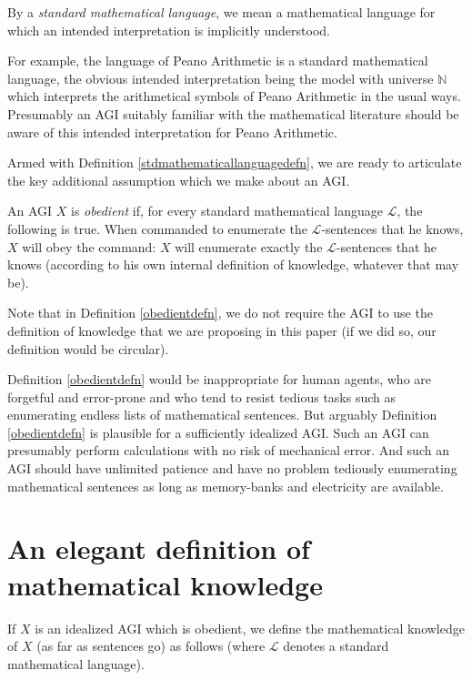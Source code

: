 \documentclass[runningheads]{llncs}
\begin{document}
\begin{definition}
\label{stdmathematicallanguagedefn}
By a \emph{standard mathematical language}, we mean a mathematical language for which an
intended interpretation is implicitly understood.
\end{definition}

For example, the
language of Peano Arithmetic is a standard mathematical language, the obvious
intended interpretation being the model with universe $\mathbb N$ which
interprets the arithmetical symbols of Peano Arithmetic in the usual ways.
Presumably an AGI suitably familiar with the mathematical literature should
be aware of this intended interpretation for Peano Arithmetic.

Armed with Definition \ref{stdmathematicallanguagedefn}, we are ready to articulate
the key additional assumption which we make about an AGI.

\begin{definition}
\label{obedientdefn}
  An AGI $X$ is \emph{obedient} if, for every standard mathematical language
  $\mathscr L$, the following is true. When commanded to enumerate the
  $\mathscr L$-sentences that he knows, $X$ will obey the command:
  $X$ will enumerate exactly the $\mathscr L$-sentences that he knows
  (according to his own internal definition of knowledge,
  whatever that may be).
\end{definition}


Note that in Definition \ref{obedientdefn}, we do not require the AGI to use
the definition of knowledge that we are proposing in this paper (if we did so,
our definition would be circular).

Definition \ref{obedientdefn} would be inappropriate
for human agents, who are forgetful and error-prone and who tend to resist
tedious tasks such as enumerating endless lists of
mathematical sentences. But arguably Definition \ref{obedientdefn} is plausible for a
sufficiently idealized AGI. Such an AGI can presumably perform calculations with
no risk of mechanical error. And such an AGI should have unlimited patience and have no
problem tediously enumerating mathematical sentences as long as memory-banks
and electricity are available.


\section{An elegant definition of mathematical knowledge}
\label{mainsection}

If $X$ is an idealized AGI which is obedient, we define the mathematical
knowledge of $X$ (as far as sentences go)
as follows (where $\mathscr L$ denotes a standard mathematical
language).
\end{document}
